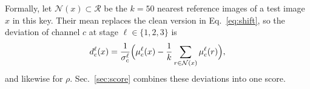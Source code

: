 Formally, let $\mathcal{N}(x) \subset \mathcal{R}$ be the $k = 50$ nearest reference images of a test image $x$ in this key. Their mean replaces the clean version in Eq.~\eqref{eq:shift}, so the deviation of channel $c$ at stage $\ell \in \{1, 2, 3\}$ is
\begin{equation}
  d^{\ell}_{c}(x) = \frac{1}{\sigma^{\ell}_{c}} \Bigl( \mu^{\ell}_{c}(x) - \frac{1}{k} \sum_{r \in \mathcal{N}(x)} \mu^{\ell}_{c}(r) \Bigr) ,
  \label{eq:deviation}
\end{equation}
and likewise for $\rho$. Sec.~\ref{sec:score} combines these deviations into one score.

%
%

